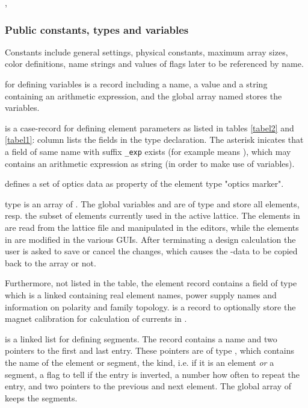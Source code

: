 \documentclass[12pt]{article}
\newcommand\code[1]{{\tt #1}}
\newcommand{\unico}[1]{{\color{burntorange}\code{#1}}}
\newcommand{\opagui}[1]{\colorbox{blue!20}{{\color{black}\code{#1}}}}
\newcommand{\ogui}[1]{\hyperref[#1]{\opagui{#1}}}
\newcommand{\opauni}[1]{\colorbox{orange!30}{{\color{black}\code{#1}}}}
\newcommand{\uses}[1]{\flushleft {\bf Uses:} #1}
\newcommand{\pvar}[1]{\subsubsection*{Public constants, types and variables} #1}
\begin{document}
\uses{\opauni{mathlib}, \opauni{comauxlib}}



\pvar{}
Constants include general settings, physical constants, maximum array sizes, color definitions, name strings and values of flags later to be referenced by name.

\unico{Variable\_type} for defining variables is a record including a name, a value and a string containing an arithmetic expression, and the global array named \unico{Variable} stores the variables. 

\unico{ElementType} is a case-record for defining element parameters as listed in tables \ref{tabel2} and \ref{tabel1}: column \unico{in record} lists the fields in the type declaration. The asterisk inicates that a field of same name with suffix \code{\_exp} exists (for example \unico{l*} means \unico{l\_exp}), which may contains an arithmetic expression as string (in order to make use of variables).

\unico{OmarkType} defines a set of optics data as property of the element type "optics marker".

\unico{ElemArr} type is an array of \unico{ElementType}. 
The global variables \unico{Elem} and \unico{Ella} are of type \unico{ElemArr} and store all elements, resp. the subset of elements currently used in the active lattice. The elements in \unico{Elem} are read from the lattice file and manipulated in the editors, while the elements in \unico{Ella} are modified in the various GUIs. After terminating a design calculation the user is asked to save or cancel the changes, which causes the \unico{Ella}-data to be copied back to the \unico{Elem} array or not.

Furthermore, not listed in the table, the element record contains a field \unico{nl} of type \unico{NameListType} which is a linked containing real element names, power supply names and information on polarity and family topology. 
\unico{calibrationType} is a record to optionally store the magnet calibration for calculation of currents in \ogui{opacurrents}.

\unico{Segment\_type} is a linked list for defining segments. The record contains a name and two pointers to the first and last entry. These pointers are of type \unico{AbstractElement\_type}, which contains the name of the element or segment, the kind, i.e. if it is an element {\em or} a segment, a flag to tell if the entry is inverted, a number how often to repeat the entry, and two pointers to the previous and next element. The global array \unico{Segm} of \unico{Segment\_type} keeps the segments.
\end{document}
